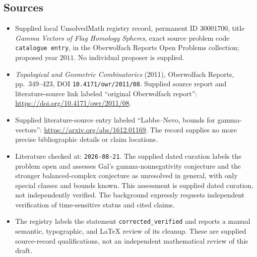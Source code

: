 \documentclass[11pt]{article}
\begin{document}
\subsection{Sources}
\begin{itemize}
\item Supplied local UnsolvedMath registry record, permanent ID \(30001700\), title \emph{Gamma Vectors of Flag Homology Spheres}, exact source problem code \texttt{catalogue entry}, in the Oberwolfach Reports Open Problems collection; proposed year \(2011\). No individual proposer is supplied.
\item \emph{Topological and Geometric Combinatorics} (2011), Oberwolfach Reports, pp.\ 349--423, DOI \texttt{10.4171/owr/2011/08}. Supplied source report and literature-source link labeled ``original Oberwolfach report'': \url{https://doi.org/10.4171/owr/2011/08}.
\item Supplied literature-source entry labeled ``Labbe--Nevo, bounds for gamma-vectors'': \url{https://arxiv.org/abs/1612.01169}. The record supplies no more precise bibliographic details or claim locations.
\item Literature checked at: \texttt{2026-08-21}. The supplied dated curation labels the problem open and assesses Gal's gamma-nonnegativity conjecture and the stronger balanced-complex conjecture as unresolved in general, with only special classes and bounds known. This assessment is supplied dated curation, not independently verified. The background expressly requests independent verification of time-sensitive status and cited claims.
\item The registry labels the statement \texttt{corrected\_verified} and reports a manual semantic, typographic, and LaTeX review of its cleanup. These are supplied source-record qualifications, not an independent mathematical review of this draft.
\end{itemize}
\end{document}

